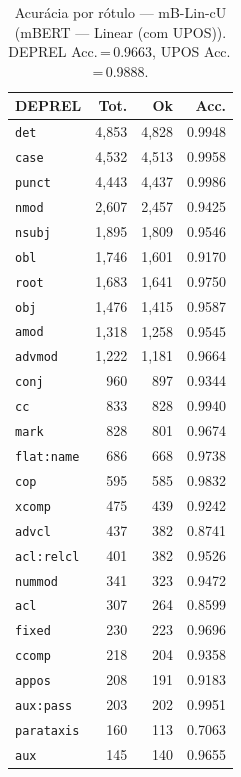 \begin{table}[ht]
\centering
\caption{Acurácia por rótulo --- mB-Lin-cU (mBERT — Linear (com UPOS)). DEPREL Acc.\,=\,0.9663, UPOS Acc.\,=\,0.9888.}
\label{tab:acc-predict-test-df-mbert-linear}
\begin{minipage}[t]{0.55\linewidth}
\centering\scriptsize
\begin{tabular}{lrrr}
\toprule
\textbf{DEPREL} & \textbf{Tot.} & \textbf{Ok} & \textbf{Acc.} \\
\midrule
\texttt{det} & 4,853 & 4,828 & 0.9948 \\
\texttt{case} & 4,532 & 4,513 & 0.9958 \\
\texttt{punct} & 4,443 & 4,437 & 0.9986 \\
\texttt{nmod} & 2,607 & 2,457 & 0.9425 \\
\texttt{nsubj} & 1,895 & 1,809 & 0.9546 \\
\texttt{obl} & 1,746 & 1,601 & 0.9170 \\
\texttt{root} & 1,683 & 1,641 & 0.9750 \\
\texttt{obj} & 1,476 & 1,415 & 0.9587 \\
\texttt{amod} & 1,318 & 1,258 & 0.9545 \\
\texttt{advmod} & 1,222 & 1,181 & 0.9664 \\
\texttt{conj} & 960 & 897 & 0.9344 \\
\texttt{cc} & 833 & 828 & 0.9940 \\
\texttt{mark} & 828 & 801 & 0.9674 \\
\texttt{flat\!:\!name} & 686 & 668 & 0.9738 \\
\texttt{cop} & 595 & 585 & 0.9832 \\
\texttt{xcomp} & 475 & 439 & 0.9242 \\
\texttt{advcl} & 437 & 382 & 0.8741 \\
\texttt{acl\!:\!relcl} & 401 & 382 & 0.9526 \\
\texttt{nummod} & 341 & 323 & 0.9472 \\
\texttt{acl} & 307 & 264 & 0.8599 \\
\texttt{fixed} & 230 & 223 & 0.9696 \\
\texttt{ccomp} & 218 & 204 & 0.9358 \\
\texttt{appos} & 208 & 191 & 0.9183 \\
\texttt{aux\!:\!pass} & 203 & 202 & 0.9951 \\
\texttt{parataxis} & 160 & 113 & 0.7063 \\
\texttt{aux} & 145 & 140 & 0.9655 \\

\end{tabular}
\end{minipage}
\end{table}
